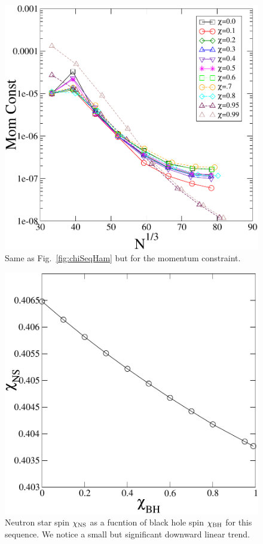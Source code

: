 \begin{figure}
\includegraphics[width=0.95\columnwidth]{chap4/chiSeqMom}
\caption[]{\label{fig:chiSeqMom} Same as
  Fig.~\ref{fig:chiSeqHam} but for the momentum constraint.}
\end{figure}

\begin{figure}
\includegraphics[width=0.95\columnwidth]{chap4/chichi}
\caption[]{\label{fig:chichi}Neutron star spin $\chi_{\rm NS}$ as a fucntion of black hole spin $\chi_{\rm BH}$ for this sequence. We notice a small but significant downward linear trend. }
\end{figure}



